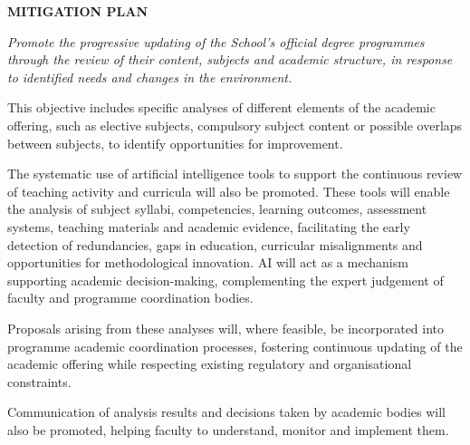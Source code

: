 \documentclass[11pt,a4paper]{scrreprt}
\begin{document}
\begin{tcolorbox}[mitbox]
{\footnotesize\sffamily\bfseries\color{green!40!black} MITIGATION PLAN}\par{}
\end{tcolorbox}
\vspace{8pt}



\newpage
{}
{\small\color{mutedcolor}\itshape Promote the progressive updating of the School's official degree programmes through the review of their content, subjects and academic structure, in response to identified needs and changes in the environment. 

This objective includes specific analyses of different elements of the academic offering, such as elective subjects, compulsory subject content or possible overlaps between subjects, to identify opportunities for improvement. 

The systematic use of artificial intelligence tools to support the continuous review of teaching activity and curricula will also be promoted. These tools will enable the analysis of subject syllabi, competencies, learning outcomes, assessment systems, teaching materials and academic evidence, facilitating the early detection of redundancies, gaps in education, curricular misalignments and opportunities for methodological innovation. AI will act as a mechanism supporting academic decision-making, complementing the expert judgement of faculty and programme coordination bodies.

Proposals arising from these analyses will, where feasible, be incorporated into programme academic coordination processes, fostering continuous updating of the academic offering while respecting existing regulatory and organisational constraints. 

Communication of analysis results and decisions taken by academic bodies will also be promoted, helping faculty to understand, monitor and implement them. }\par\vspace{6pt}
\end{document}
